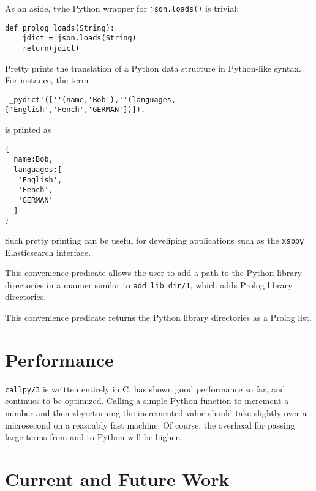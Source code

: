 \begin{description}
As an aside, tvhe Python wrapper for {\tt json.loads()} is trivial:
\begin{verbatim}
def prolog_loads(String):
    jdict = json.loads(String)
    return(jdict)
\end{verbatim}


Pretty prints the translation of a Python data structure in
Python-like syntax.  For instance, the term

\begin{verbatim}
'_pydict'([''(name,'Bob'),''(languages,['English','Fench','GERMAN'])]).
\end{verbatim}

\noindent
is printed as 
\begin{verbatim}
{
  name:Bob,
  languages:[
   'English','
   'Fench',
   'GERMAN'
  ]
}
\end{verbatim}

Such pretty printing can be useful for develiping applications such as
the {\tt xsbpy} Elasticsearch interface.

%
This convenience predicate allows the user to add a path to the Python
library directories in a manner similar to {\tt add\_lib\_dir/1},
which adds Prolog library directories.  

%
This convenience predicate returns the Python library directories as a
Prolog list.

\end{description}

\section{Performance}

{\tt callpy/3} is written entirely in C, has shown good performance so
far, and continues to be optimized.  Calling a simple Python function
to increment a number and then zbyreturning the incremented value should
take slightly over a microsecond on a reasoably fast machine.  Of
course, the overhead for passing large terms from and to Python will
be higher.

\section{Current and Future Work}

